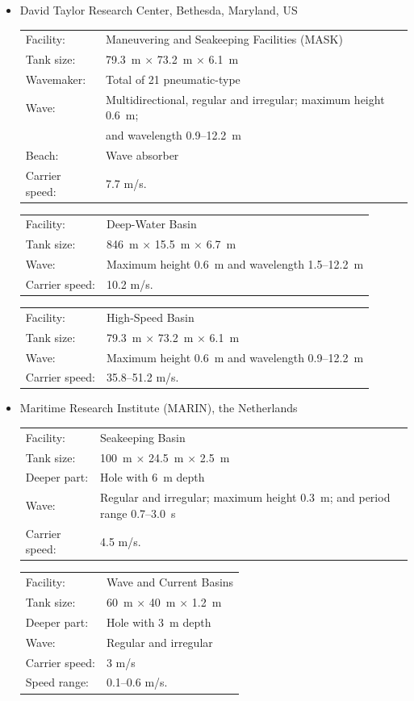 \documentclass[12pt,a4paper]{report}
\begin{document}
\begin{itemize}[leftmargin=1.5em]
\item[\textbf{d.}] David Taylor Research Center, Bethesda, Maryland, US \\
\begin{tabular}{@{}ll}
Facility:& Maneuvering and Seakeeping Facilities (MASK) \\
Tank size:& 79.3~m $\times$ 73.2~m $\times$ 6.1~m \\
Wavemaker:& Total of 21 pneumatic-type \\
Wave:& Multidirectional, regular and irregular; maximum height 0.6~m;\\
     & and wavelength 0.9--12.2~m \\
Beach:& Wave absorber \\
Carrier speed:& 7.7 m/s.
\end{tabular}

\begin{tabular}{@{}ll}
Facility:& Deep-Water Basin \\
Tank size:& 846~m $\times$ 15.5~m $\times$ 6.7~m \\
Wave:& Maximum height 0.6~m and wavelength 1.5--12.2~m \\
Carrier speed:& 10.2 m/s. 
\end{tabular}

\begin{tabular}{@{}ll}
Facility:& High-Speed Basin \\
Tank size:& 79.3~m $\times$ 73.2~m $\times$ 6.1~m \\
Wave:& Maximum height 0.6~m and wavelength 0.9--12.2~m \\
Carrier speed:& 35.8--51.2 m/s.
\end{tabular}

\item[\textbf{e.}] Maritime Research Institute (MARIN), the Netherlands \\
\begin{tabular}{@{}ll}
Facility:& Seakeeping Basin \\ 
Tank size:& 100~m $\times$ 24.5~m $\times$ 2.5~m \\
Deeper part:& Hole with 6~m depth \\
Wave:& Regular and irregular; maximum height 0.3~m; and period range 0.7--3.0~s \\
Carrier speed:& 4.5 m/s.
\end{tabular}

\begin{tabular}{@{}ll}
Facility:& Wave and Current Basins \\
Tank size:& 60~m $\times$ 40~m $\times$ 1.2~m \\
Deeper part:& Hole with 3~m depth \\
Wave:& Regular and irregular \\
Carrier speed:& 3 m/s \\
Speed range:& 0.1--0.6 m/s.
\end{tabular}


\end{itemize}
\end{document}
